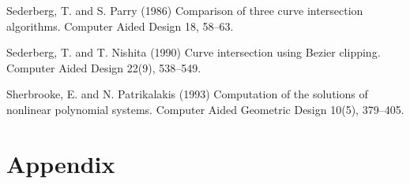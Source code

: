 \documentclass[10pt,twocolumn]{article}
\newif\ifTalk
\begin{document}
\begin{thebibliography}{99}

Sederberg, T. and S. Parry (1986)
Comparison of three curve intersection algorithms.
Computer Aided Design 18, 58--63.

Sederberg, T. and T. Nishita (1990)
Curve intersection using Bezier clipping.
Computer Aided Design 22(9), 538--549.

Sherbrooke, E. and N. Patrikalakis (1993)
Computation of the solutions of nonlinear polynomial systems.
Computer Aided Geometric Design 10(5), 379--405.

\ifTalk
\bibitem{selig96}
Selig, J. (1996)
Geometrical Methods in Robotics.
Springer Verlag (New York).
\fi

\end{thebibliography}

\section{Appendix}



\end{document}

